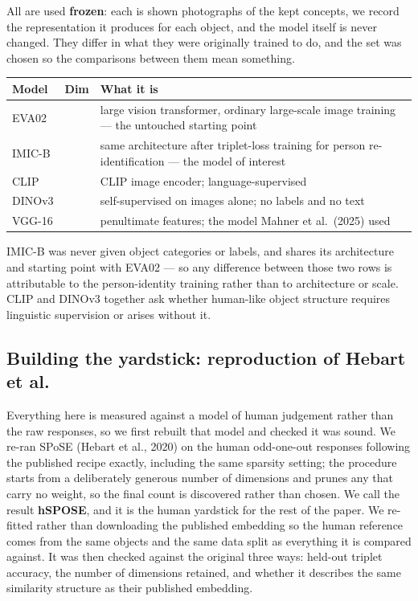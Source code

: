 \documentclass[11pt]{article}
\begin{document}
All are used \textbf{frozen}: each is shown photographs of the kept concepts, we record the
representation it produces for each object, and the model itself is never changed. They differ in
what they were originally trained to do, and the set was chosen so the comparisons between them mean
something.

\begin{center}
\begin{tabular}{@{}llL{8.6cm}@{}}
\toprule
\textbf{Model} & \textbf{Dim} & \textbf{What it is} \\
\midrule
EVA02 & & large vision transformer, ordinary large-scale image training --- the untouched starting
point \\
IMIC-B & & same architecture after triplet-loss training for person re-identification --- the model
of interest \\
CLIP & & CLIP image encoder; language-supervised \\
DINOv3 & & self-supervised on images alone; no labels and no text \\
VGG-16 & & penultimate features; the model Mahner et al.\ (2025) used \\
\bottomrule
\end{tabular}
\end{center}

IMIC-B was never given object categories or labels, and shares its architecture and starting point
with EVA02 --- so any difference between those two rows is attributable to the person-identity
training rather than to architecture or scale. CLIP and DINOv3 together ask whether human-like
object structure requires linguistic supervision or arises without it.

\subsection*{Building the yardstick: reproduction of Hebart et al.}

Everything here is measured against a model of human judgement rather than the raw responses, so we
first rebuilt that model and checked it was sound. We re-ran SPoSE (Hebart et al., 2020) on the
human odd-one-out responses following the published recipe exactly, including the same sparsity
setting; the procedure starts from a deliberately generous number of dimensions and prunes any that
carry no weight, so the final count is discovered rather than chosen. We call the result
\textbf{hSPOSE}, and it is the human yardstick for the rest of the paper. We re-fitted rather than
downloading the published embedding so the human reference comes from the same objects and the same
data split as everything it is compared against. It was then checked against the original three
ways: held-out triplet accuracy, the number of dimensions retained, and whether it describes the
same similarity structure as their published embedding.
\end{document}
